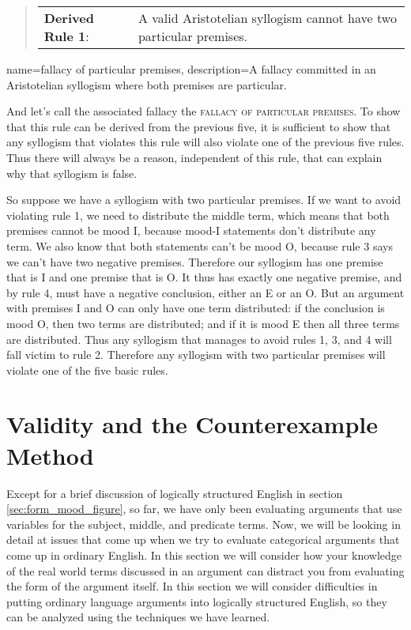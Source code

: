  \begin{quotation}
\begin{tabu}{p{.25\linewidth}p{.75\linewidth}}
\textbf{Derived Rule 1}: &  A valid Aristotelian syllogism cannot have two particular premises.
\end{tabu}\label{derived_rule_1}
\end{quotation}

{
name=fallacy of particular premises,
description={A fallacy committed in an Aristotelian syllogism where both premises are particular.}
}

And let's call the associated fallacy the \textsc{\gls{fallacy of particular premises}}. \label{def:particular_premises} To show that this rule can be derived from the previous five, it is sufficient to show that any syllogism that violates this rule will also violate one of the previous five rules. Thus there will always be a reason, independent of this rule, that can explain why that syllogism is false.

So suppose we have a syllogism with two particular premises. If we want to avoid violating rule 1, we need to distribute the middle term, which means that both premises cannot be mood I, because mood-I statements don't distribute any term. We also know that both statements can't be mood O, because rule 3 says we can't have two negative premises. Therefore our syllogism has one premise that is I and one premise that is O. It thus has exactly one negative premise, and by rule 4, must have a negative conclusion, either an E or an O. But an argument with premises I and O can only have one term distributed: if the conclusion is mood O, then two terms are distributed; and if it is mood E then all three terms are distributed. Thus any syllogism that manages to avoid rules 1, 3, and 4 will fall victim to rule 2. Therefore any syllogism with two particular premises will violate one of the five basic rules.

\section{Validity and the Counterexample Method}
\label{sec:counterexample}

Except for a brief discussion of logically structured English in section \ref{sec:form_mood_figure}, so far, we have only been evaluating arguments that use variables for the subject, middle, and predicate terms. Now, we will be looking in detail at issues that come up when we try to evaluate categorical arguments that come up in ordinary English. In this section we will consider how your knowledge of the real world terms discussed in an argument can distract you from evaluating the form of the argument itself. In this section we will consider difficulties in putting ordinary language arguments into logically structured English, so they can be analyzed using the techniques we have learned.

